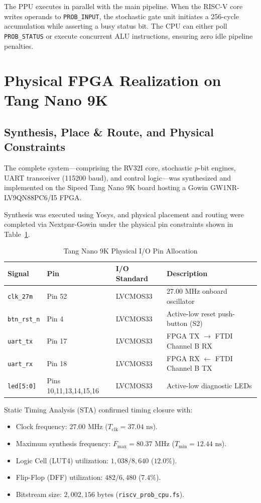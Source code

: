 \documentclass[journal,10pt,twocolumn]{IEEEtran}
\begin{document}
The PPU executes in parallel with the main pipeline. When the RISC-V core writes operands to \texttt{PROB\_INPUT}, the stochastic gate unit initiates a 256-cycle accumulation while asserting a busy status bit. The CPU can either poll \texttt{PROB\_STATUS} or execute concurrent ALU instructions, ensuring zero idle pipeline penalties.

\section{Physical FPGA Realization on Tang Nano 9K}

\subsection{Synthesis, Place \& Route, and Physical Constraints}
The complete system---comprising the RV32I core, stochastic $p$-bit engines, UART transceiver (115200 baud), and control logic---was synthesized and implemented on the Sipeed Tang Nano 9K board hosting a Gowin GW1NR-LV9QN88PC6/I5 FPGA. 

Synthesis was executed using Yosys, and physical placement and routing were completed via Nextpnr-Gowin under the physical pin constraints shown in Table~\ref{tab:cst}.

\begin{table}[h]
\centering
\caption{Tang Nano 9K Physical I/O Pin Allocation}
\label{tab:cst}
\begin{tabular}{llll}
\toprule
\textbf{Signal} & \textbf{Pin} & \textbf{I/O Standard} & \textbf{Description} \\
\midrule
\texttt{clk\_27m} & Pin 52 & LVCMOS33 & 27.00 MHz onboard oscillator \\
\texttt{btn\_rst\_n} & Pin 4 & LVCMOS33 & Active-low reset push-button (S2) \\
\texttt{uart\_tx} & Pin 17 & LVCMOS33 & FPGA TX $\to$ FTDI Channel B RX \\
\texttt{uart\_rx} & Pin 18 & LVCMOS33 & FPGA RX $\leftarrow$ FTDI Channel B TX \\
\texttt{led[5:0]} & Pins 10,11,13,14,15,16 & LVCMOS33 & Active-low diagnostic LEDs \\
\bottomrule
\end{tabular}
\end{table}

Static Timing Analysis (STA) confirmed timing closure with:
\begin{itemize}
    \item Clock frequency: $27.00\text{ MHz}$ ($T_{\text{clk}} = 37.04\text{ ns}$).
    \item Maximum synthesis frequency: $F_{\text{max}} = 80.37\text{ MHz}$ ($T_{\text{min}} = 12.44\text{ ns}$).
    \item Logic Cell (LUT4) utilization: $1,038 / 8,640$ ($12.0\%$).
    \item Flip-Flop (DFF) utilization: $482 / 6,480$ ($7.4\%$).
    \item Bitstream size: $2,002,156\text{ bytes}$ (\texttt{riscv\_prob\_cpu.fs}).
\end{itemize}
\end{document}
